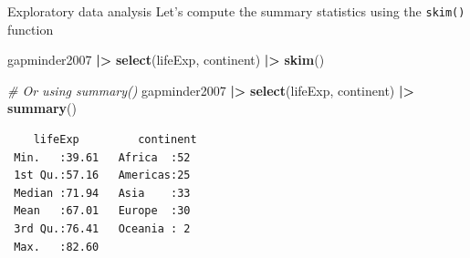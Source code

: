 \documentclass[
  ignorenonframetext,
]{beamer}
\newenvironment{Shaded}{\begin{snugshade}}{\end{snugshade}}
\newcommand{\CommentTok}[1]{\textcolor[rgb]{0.56,0.35,0.01}{\textit{#1}}}
\newcommand{\FunctionTok}[1]{\textcolor[rgb]{0.13,0.29,0.53}{\textbf{#1}}}
\newcommand{\NormalTok}[1]{#1}
\newcommand{\SpecialCharTok}[1]{\textcolor[rgb]{0.81,0.36,0.00}{\textbf{#1}}}
\begin{document}
\begin{frame}[fragile]{Exploratory data analysis}
\label{exploratory-data-analysis-3}
Let's compute the summary statistics using the \texttt{skim()} function

\normalsize

\begin{Shaded}
\begin{Highlighting}[]
\NormalTok{gapminder2007 }\SpecialCharTok{|\textgreater{}} 
  \FunctionTok{select}\NormalTok{(lifeExp, continent) }\SpecialCharTok{|\textgreater{}}
  \FunctionTok{skim}\NormalTok{()}
\end{Highlighting}
\end{Shaded}

\normalsize

\begin{Shaded}
\begin{Highlighting}[]
\CommentTok{\# Or using summary()}
\NormalTok{gapminder2007 }\SpecialCharTok{|\textgreater{}} 
  \FunctionTok{select}\NormalTok{(lifeExp, continent) }\SpecialCharTok{|\textgreater{}}
  \FunctionTok{summary}\NormalTok{()}
\end{Highlighting}
\end{Shaded}

\begin{verbatim}
    lifeExp         continent 
 Min.   :39.61   Africa  :52  
 1st Qu.:57.16   Americas:25  
 Median :71.94   Asia    :33  
 Mean   :67.01   Europe  :30  
 3rd Qu.:76.41   Oceania : 2  
 Max.   :82.60                
\end{verbatim}
\end{frame}
\end{document}
